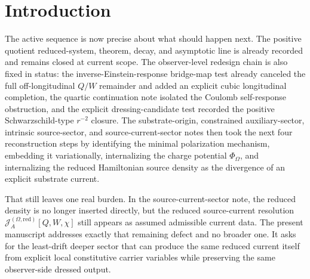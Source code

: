 \documentclass[11pt]{article}
\newcommand{\ProjSub}{P}
\newcommand{\FlowPot}{\Phi_\Omega}
\newcommand{\BalanceField}{\Pi_\Omega}
\newcommand{\SourceCurrentRed}{\mathcal J^{(\Omega,\mathrm{red})}}
\newcommand{\AuxPol}{\mathbb K}
\begin{document}
\begin{abstract}
The auxiliary polarization block is kept unchanged. It again yields
\[
\AuxPol_{AB}^{\mathrm{elim}}
=
-2\FlowPot^2U_AU_B
+\frac32\FlowPot^2\ProjSub_{AB},
\]
so the observer pullback again reproduces exactly the same Schwarzschild-type \(r^{-2}\) dressing together with the same \(\mathcal O(r^{-3})\) regular completion. Because the new constitutive layer is slice-wise nonpropagating and reaches the bridge only through the same quartic combination \(\BalanceField=\FlowPot^2\), it does not reopen the lower-order quotient PDE line and preserves the same matter-free/off-longitudinal/cubic/quartic gain package.

This note still does not claim that the constitutive coefficients \((\mathfrak c_I,\mathfrak c_\chi,\mathfrak c_W)\), the carrier basis, or the full enlarged bridge variable have already been derived uniquely from a deeper local substrate curvature action. Its narrower positive result is the one now required by the active sequence: the reduced source-current resolution itself is realized as the elimination of explicit local substrate carrier variables, and everything downstream remains the same.
\end{abstract}

\section{Introduction}

The active sequence is now precise about what should happen next. The positive quotient reduced-system, theorem, decay, and asymptotic line is already recorded and remains closed at current scope. The observer-level redesign chain is also fixed in status: the inverse-Einstein-response bridge-map test already canceled the full off-longitudinal \(Q/W\) remainder and added an explicit cubic longitudinal completion, the quartic continuation note isolated the Coulomb self-response obstruction, and the explicit dressing-candidate test recorded the positive Schwarzschild-type \(r^{-2}\) closure. The substrate-origin, constrained auxiliary-sector, intrinsic source-sector, and source-current-sector notes then took the next four reconstruction steps by identifying the minimal polarization mechanism, embedding it variationally, internalizing the charge potential \(\FlowPot\), and internalizing the reduced Hamiltonian source density as the divergence of an explicit substrate current.

That still leaves one real burden. In the source-current-sector note, the reduced density is no longer inserted directly, but the reduced source-current resolution \(\SourceCurrentRed_A[Q,W,\chi]\) still appears as assumed admissible current data. The present manuscript addresses exactly that remaining defect and no broader one. It asks for the least-drift deeper sector that can produce the same reduced current itself from explicit local constitutive carrier variables while preserving the same observer-side dressed output.
\end{document}
